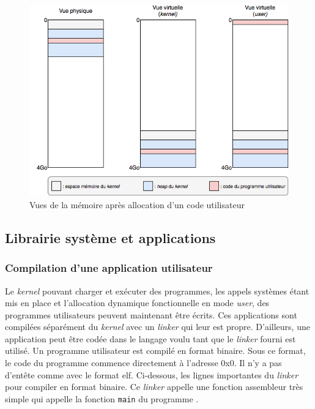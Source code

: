 \begin{figure}[!h]
  \centering
  \includegraphics[scale=.7]{images/alloc_user.png}
  \caption{Vues de la mémoire après allocation d'un code utilisateur}
  \label{mem_view_user}
\end{figure}


\subsection{Librairie système et applications}
\subsubsection{Compilation d'une application utilisateur}
\label{sec:user:compil}
Le \textit{kernel} pouvant charger et exécuter des programmes, les appels systèmes
étant mis en place et l'allocation dynamique fonctionnelle en mode \textit{user},
des programmes utilisateurs peuvent maintenant être écrits. Ces applications
sont compilées séparément du \textit{kernel} avec un \textit{linker} qui leur
est propre. D'ailleurs, une application peut être codée dans le langage voulu
tant que le \textit{linker} fourni est utilisé. Un programme utilisateur est
compilé en format binaire. Sous ce format, le code du programme commence directement
à l'adresse 0x0. Il n'y a pas d'entête comme avec le format \acrshort{elf}.
Ci-dessous, les lignes importantes du \textit{linker} pour compiler en format
binaire. Ce \textit{linker} appelle une fonction assembleur très simple qui
appelle la fonction \texttt{main} du programme \cite{ref42}.

